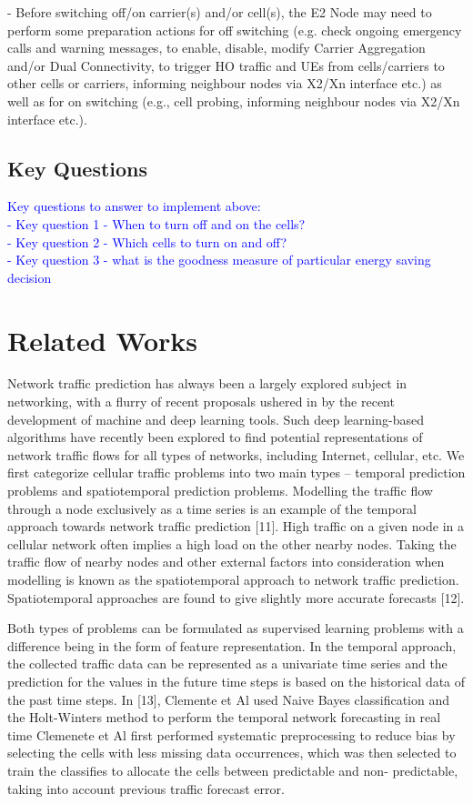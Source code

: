\documentclass[conference]{IEEEtran}
\begin{document}
- Before switching off/on carrier(s) and/or cell(s), the E2 Node may need to perform some preparation actions for off switching (e.g. check ongoing emergency calls and warning messages, to enable, disable, modify Carrier Aggregation and/or Dual Connectivity, to trigger HO traffic and UEs from cells/carriers to other cells or carriers, informing neighbour nodes via X2/Xn interface etc.) as well as for on switching (e.g., cell probing, informing neighbour nodes via X2/Xn interface etc.). \\

\subsection{Key Questions}
\textcolor{blue}{
Key questions to answer to implement above: \\
- Key question 1 - When to turn off and on the cells? \\
- Key question 2 - Which cells to turn on and off? \\
- Key question 3 - what is the goodness measure of particular energy saving decision \\
}


\section{Related Works}

Network traffic prediction has always been a largely explored subject in networking, with a flurry of recent proposals ushered in by the recent development of machine and deep learning tools. Such deep learning-based algorithms have recently been explored to find potential representations of network traffic flows for all types of networks, including Internet, cellular, etc. We first categorize cellular traffic problems into two main types – temporal prediction problems and spatiotemporal prediction problems. Modelling the traffic flow through a node exclusively as a time series is an example of the temporal approach towards network traffic prediction [11]. High traffic on a given node in a cellular network often implies a high load on the other nearby nodes. Taking the traffic flow of nearby nodes and other external factors into consideration when modelling is known as the spatiotemporal approach to network traffic prediction. Spatiotemporal approaches are found to give slightly more accurate forecasts [12].

Both types of problems can be formulated as supervised learning problems with a difference being in the form of feature representation. In the temporal approach, the collected traffic data can be represented as a univariate time series and the prediction for the values in the future time steps is based on the historical data of the past time steps. In [13], Clemente et Al used Naive Bayes classification and the Holt-Winters method to perform the temporal network forecasting in real time Clemenete et Al first performed systematic preprocessing to reduce bias by selecting the cells with less missing data occurrences, which was then selected to train the classifies to allocate the cells between predictable and non- predictable, taking into account previous traffic forecast error. 
\end{document}
